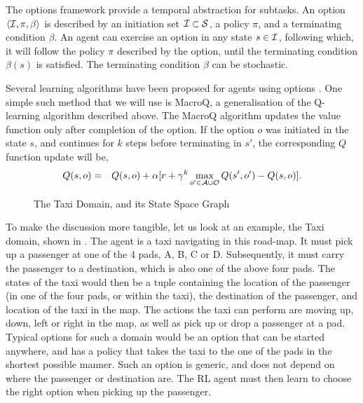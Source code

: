 The options framework provide a temporal abstraction for subtasks. An
option $\langle  \mathcal{I},\pi,\beta \rangle$ is described by an initiation set $\mathcal{I} \subset
\mathcal{S}$, a policy $\pi$, and a terminating condition $\beta$.  An agent
can exercise an option in any state $s \in \mathcal{I}$, following which,
it will follow the policy $\pi$ described by the option, until the
terminating condition $\beta(s)$ is satisfied. The terminating condition
$\beta$ can be stochastic.

Several learning algorithms have been proposed for agents using options
\cite{SuttonPrecupSingh1999,BartoMahadevan2003}. One simple such method that
we will use is MacroQ, a generalisation of the Q-learning algorithm
described above. The MacroQ algorithm updates the value function only
after completion of the option. If the option $o$ was initiated in the
state $s$, and continues for $k$ steps before terminating in $s'$, the
corresponding $Q$ function update will be,
\begin{eqnarray*}
    Q(s,o) &=& Q(s,o) + \alpha [ r + \gamma^{k} \max_{o' \in \mathcal{A} \cup \mathcal{O}} Q(s',o') - Q(s,o) ].
\end{eqnarray*}

\begin{figure}[th]
    \center
    \subfigure{
      
      \label{fig:taxi-domain}
    }
    \caption{The Taxi Domain, and its State Space Graph}
\end{figure}

\begin{example}
To make the discussion more tangible, let us look at an example, the
Taxi domain, shown in . The agent is a taxi
navigating in this road-map. It must pick up a passenger at one of the
4 pads, A, B, C or D.  Subsequently, it must carry the passenger to a
destination, which is also one of the above four pads. The states of
the taxi would then be a tuple containing the location of the
passenger (in one of the four pads, or within the taxi), the
destination of the passenger, and location of the taxi in the map.
The actions the taxi can perform are moving up, down, left or right in
the map, as well as pick up or drop a passenger at a pad. 
Typical options for such a domain would be an option that can be
started anywhere, and has a policy that takes the taxi to the one of
the pads in the shortest possible manner. Such an option is generic,
and does not depend on where the passenger or destination are. The RL
agent must then learn to choose the right option when picking up the
passenger.
\end{example}

